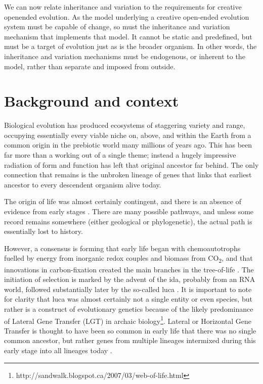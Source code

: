 We can now relate inheritance and variation to the requirements for creative openended evolution. As the model underlying a creative open-ended evolution system must be capable of change, so must the inheritance and variation mechanism that implements that model. It cannot be static and predefined, but must be a target of evolution just as is the broader organism. In other words, the inheritance and variation mechanisms must be endogenous, or inherent to the model, rather than separate and imposed from outside.

\section{Background and context}\label{background-and-context}

Biological evolution has produced ecosystems of staggering variety and range, occupying essentially every viable niche on, above, and within the Earth from a common origin in the prebiotic world many millions of years ago. This has been far more than a working out of a single theme; instead a hugely impressive radiation of form and function has left that original ancestor far behind. The only connection that remains is the unbroken lineage of genes that links that earliest ancestor to every descendent organism alive today.



The origin of life was almost certainly contingent, and there is an absence of evidence from early stages \parencite{Pross2013}. There are many possible pathways, and unless some record remains somewhere (either geological or phylogenetic), the actual path is essentially lost to history.

However, a consensus is forming that early life began with chemoautotrophs fuelled by energy from inorganic redox couples and biomass from CO\textsubscript{2}, and that innovations in carbon-fixation created the main branches in the tree-of-life \parencite{Braakman2012}. The initiation of selection is marked by the advent of the \gls{ida}, probably from an RNA world, followed substantially later by the so-called \gls{luca} \parencite{Yarus2011}. It is important to note for clarity that \gls{luca} was almost certainly not a single entity or even species, but rather is a construct of evolutionary genetics because of the likely predominance of Lateral Gene Transfer (LGT) in archaic biology\footnote{http://sandwalk.blogspot.ca/2007/03/web-of-life.html}. Lateral or Horizontal Gene Transfer is thought to have been so common in early life that there was no single common ancestor, but rather genes from multiple lineages intermixed during this early stage into all lineages today \parencite{Ragan2009}.

